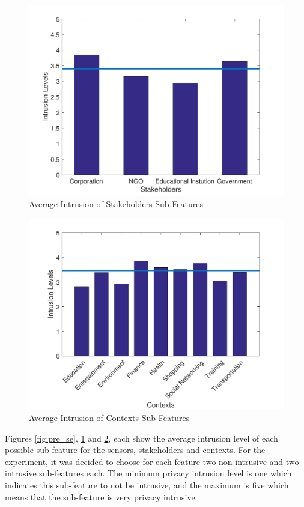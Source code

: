 \begin{figure}[ht!]
\centering
\includegraphics[width=\textwidth,height=0.7\textwidth,keepaspectratio]{./images/pre_st}
\caption{Average Intrusion of Stakeholders Sub-Features}
\label{fig:pre_st}
\end{figure}

\begin{figure}[ht!]
\centering
\includegraphics[width=\textwidth,keepaspectratio]{./images/pre_co}
\caption{Average Intrusion of Contexts Sub-Features}
\label{fig:pre_co}
\end{figure}

Figures \ref{fig:pre_se}, \ref{fig:pre_st} and \ref{fig:pre_co}, each show the average intrusion level of each possible sub-feature for
the sensors, stakeholders and contexts. For the experiment, it was decided to choose for each feature two non-intrusive and two intrusive sub-features
each. The minimum privacy intrusion level is one which indicates this sub-feature to not be intrusive, and the maximum is five which means that the sub-feature is very privacy intrusive.

